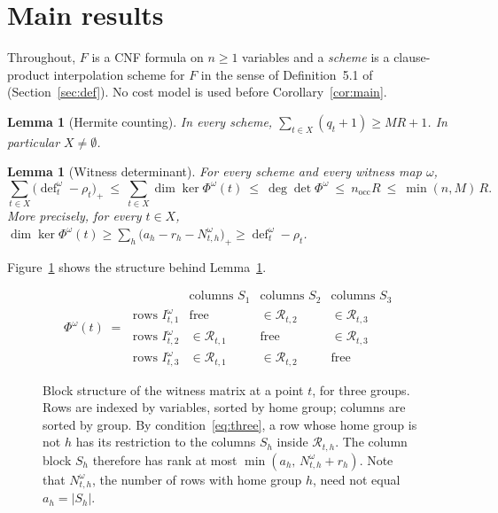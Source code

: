 \documentclass[11pt,a4paper]{article}
\newtheorem{lemma}[theorem]{Lemma}
\theoremstyle{definition}
\theoremstyle{remark}
\newcommand{\cR}{\mathcal{R}}
\newcommand{\dfc}{\operatorname{def}}
\newcommand{\nocc}{n_{\mathrm{occ}}}
\begin{document}
\section{Main results}\label{sec:results}

Throughout, $F$ is a CNF formula on $n\ge1$ variables and a \emph{scheme} is a clause-product
interpolation scheme for $F$ in the sense of Definition~5.1 of~\cite{DL}
(Section~\ref{sec:def}). No cost model is used before Corollary~\ref{cor:main}.

\begin{lemma}[Hermite counting]\label{lem:hermite}
In every scheme, $\sum_{t\in X}(q_t+1)\ge MR+1$. In particular $X\ne\emptyset$.
\end{lemma}

\begin{lemma}[Witness determinant]\label{lem:det}
For every scheme and every witness map $\omega$,
\[
\sum_{t\in X}\bigl(\dfc^\omega_t-\rho_t\bigr)_+\ \le\ \sum_{t\in X}\dim\ker\Phi^\omega(t)
\ \le\ \deg\det\Phi^\omega\ \le\ \nocc R\ \le\ \min(n,M)\,R .
\]
More precisely, for every $t\in X$,
$\dim\ker\Phi^\omega(t)\ge\sum_h\bigl(a_h-r_h-N^\omega_{t,h}\bigr)_+\ge\dfc^\omega_t-\rho_t$.
\end{lemma}

Figure~\ref{fig:blocks} shows the structure behind Lemma~\ref{lem:det}.

\begin{figure}[t]
\[
\Phi^\omega(t)\;=\;
\begin{array}{r|ccc}
 & \text{columns } S_{1} & \text{columns } S_{2} & \text{columns } S_{3}\\ \hline
\text{rows } I^\omega_{t,1} & \text{free} & \in\cR_{t,2} & \in\cR_{t,3}\\
\text{rows } I^\omega_{t,2} & \in\cR_{t,1} & \text{free} & \in\cR_{t,3}\\
\text{rows } I^\omega_{t,3} & \in\cR_{t,1} & \in\cR_{t,2} & \text{free}
\end{array}
\]
\caption{Block structure of the witness matrix at a point $t$, for three groups. Rows are
indexed by variables, sorted by home group; columns are sorted by group. By
condition~\eqref{eq:three}, a row whose home group is not $h$ has its restriction to the
columns $S_h$ inside $\cR_{t,h}$. The column block $S_h$ therefore has rank at most
$\min(a_h,\,N^\omega_{t,h}+r_h)$. Note that $N^\omega_{t,h}$, the number of rows with home
group $h$, need not equal $a_h=|S_h|$.}\label{fig:blocks}
\end{figure}
\end{document}
